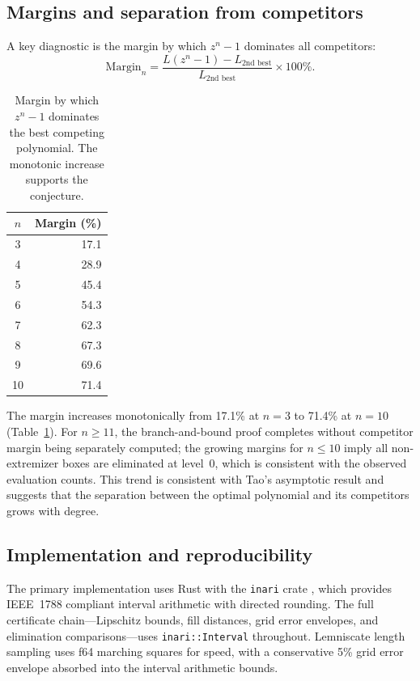 \documentclass[11pt]{article}
\theoremstyle{plain}
\theoremstyle{definition}
\theoremstyle{remark}
\begin{document}
\subsection{Margins and separation from competitors}

A key diagnostic is the margin by which $z^n - 1$ dominates all competitors:
\[
\mathrm{Margin}_n = \frac{L(z^n - 1) - L_{\text{2nd best}}}{L_{\text{2nd best}}} \times 100\%.
\]

\begin{table}[ht]
\centering
\caption{Margin by which $z^n - 1$ dominates the best competing polynomial. The monotonic increase supports the conjecture.}
\label{tab:margins}
\begin{tabular}{cr}
\toprule
$n$ & \textbf{Margin (\%)} \\
\midrule
3 & 17.1 \\
4 & 28.9 \\
5 & 45.4 \\
6 & 54.3 \\
7 & 62.3 \\
8 & 67.3 \\
9 & 69.6 \\
10 & 71.4 \\
\bottomrule
\end{tabular}
\end{table}

The margin increases monotonically from 17.1\% at $n=3$ to 71.4\% at $n=10$ (Table~\ref{tab:margins}). For $n \geq 11$, the branch-and-bound proof completes without competitor margin being separately computed; the growing margins for $n \leq 10$ imply all non-extremizer boxes are eliminated at level~0, which is consistent with the observed evaluation counts. This trend is consistent with Tao's asymptotic result and suggests that the separation between the optimal polynomial and its competitors grows with degree.

\subsection{Implementation and reproducibility}
\label{sec:crossval}

The primary implementation uses Rust with the \texttt{inari} crate \cite{inari}, which provides IEEE~1788 compliant interval arithmetic with directed rounding. The full certificate chain---Lipschitz bounds, fill distances, grid error envelopes, and elimination comparisons---uses \texttt{inari::Interval} throughout. Lemniscate length sampling uses f64 marching squares for speed, with a conservative 5\% grid error envelope absorbed into the interval arithmetic bounds.
\end{document}
